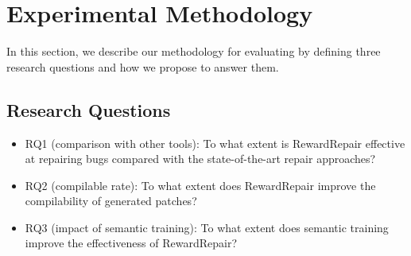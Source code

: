 \section{Experimental Methodology}

In this section, we describe our methodology for evaluating \approach by defining three research questions and how we propose to answer them.

\subsection{Research Questions}

\begin{itemize}

\item RQ1 (comparison with other tools): To what extent is RewardRepair effective at repairing bugs compared with the state-of-the-art repair approaches?

\item RQ2 (compilable rate): To what extent does RewardRepair improve the compilability of generated patches? 

\item RQ3 (impact of semantic training): To what extent does semantic training improve the effectiveness of RewardRepair? 

\end{itemize}

